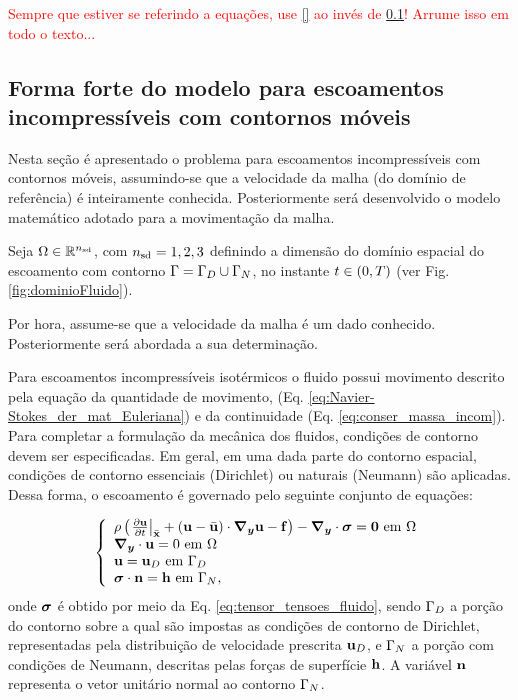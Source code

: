 \documentclass[tese_patricia]{subfiles}%
\begin{document}
\textcolor{red}{Sempre que estiver se referindo a equações, use \eqref{} ao invés de \ref{}! Arrume isso em todo o texto...}

\subsection{Forma forte do modelo para escoamentos incompressíveis com contornos móveis}

Nesta seção é apresentado o problema para escoamentos incompressíveis com contornos móveis, assumindo-se que a velocidade da malha (do domínio de referência) é inteiramente conhecida. Posteriormente será desenvolvido o modelo matemático adotado para a movimentação da malha.

Seja $\Omega \in \mathbb{R}^{{n_{\mathrm{sd}}}}$, com ${n_{\mathrm{sd}}} = 1,2,3$ definindo a dimensão do domínio espacial do escoamento com contorno $\Gamma = \Gamma_{D} \cup \Gamma_{N}$, no instante $t \in (0,T)$ (ver Fig. \ref{fig:dominioFluido}).

Por hora, assume-se que a velocidade da malha é um dado conhecido. Posteriormente será abordada a sua determinação.

Para escoamentos incompressíveis isotérmicos o fluido possui movimento descrito pela equação da quantidade de movimento, (Eq. \eqref{eq:Navier-Stokes_der_mat_Euleriana}) e da continuidade (Eq. \ref{eq:conser_massa_incom}). Para completar a formulação da mecânica dos fluidos, condições de contorno devem ser especificadas. Em geral, em uma dada parte do contorno espacial, condições de contorno essenciais (Dirichlet) ou naturais (Neumann) são aplicadas. Dessa forma, o escoamento é governado pelo seguinte conjunto de equações:

\begin{equation}
	\left\{
	\begin{array}{l}
		\density\left( \left. \frac{\partial\velocity}{\partial t} \right|_{\posALE}  + \left(\velocity - \velocityALE \right)\cdot\gradient\velocity - \sbodyforce \right) - \divergence \cdot \stressTensor = \vzero  \ \textrm{em} \ \domain\\
		\divergence \cdot \velocity = 0  \ \textrm{em} \ \domain\\
		\velocity = \velocityD \ \textrm{em} \ \boundaryD \\
		\stressTensor \cdot \snormal = \surfaceLoad \ \textrm{em} \ \boundaryN,
	\end{array} \label{eq:conj_eq_DFC_ALE}
	\right.
\end{equation}
\noindent onde $\boldsymbol{\sigma}$ é obtido por meio da Eq. \eqref{eq:tensor_tensoes_fluido}, sendo $\Gamma_{D}$ a porção do contorno sobre a qual são impostas as condições de contorno de Dirichlet, representadas pela distribuição de velocidade prescrita $\mathbf{u}_D$, e $\Gamma_{N}$ a porção com condições de Neumann, descritas pelas forças de superfície $\mathbf{h}$. A variável $\mathbf{n}$ representa o vetor unitário normal ao contorno $\Gamma_{N}$.
\end{document}
